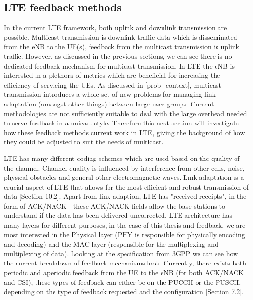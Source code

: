 \documentclass{article}
\begin{document}
\subsection{LTE feedback methods}\label{lte_feedback_current}




In the current LTE framework, both uplink and downlink transmission are possible. Multicast transmission is downlink traffic data which is disseminated from the eNB to the UE(s), feedback from the multicast transmission is uplink traffic. However, as discussed in the previous sections, we can see there is no dedicated feedback mechanism for multicast transmission. In LTE the eNB is interested in a plethora of metrics which are beneficial for increasing the efficiency of servicing the UEs. As discussed in \cref{prob_context}, multicast transmission introduces a whole set of new problems for managing link adaptation (amongst other things) between large user groups. Current methodologies are not sufficiently suitable to deal with the large overhead needed to serve feedback in a unicast style. Therefore this next section will investigate how these feedback methods current work in LTE, giving the background of how they could be adjusted to suit the needs of multicast.

LTE has many different coding schemes which are used based on the quality of the channel. Channel quality is influenced by interference from other cells, noise,  physical obstacles and general other electromagnetic waves.  Link adaptation is a crucial aspect of LTE that allows for the most efficient and robust transmission of data \cite{umts_sesia}[Section 10.2]. Apart from link adaption, LTE has "received receipts", in the form of ACK/NACK - these ACK/NACK fields allow the base stations to understand if the data has been delivered uncorrected. LTE architecture has many layers for different purposes, in the case of this thesis and feedback, we are most interested in the Physical layer (PHY is responsible for physically encoding and decoding) and the MAC layer (responsible for the multiplexing and multiplexing of data). Looking at the specification from 3GPP we can see how the current breakdown of feedback mechanisms look. Currently, there exists both periodic and aperiodic feedback from the UE to the eNB (for both ACK/NACK and CSI), these types of feedback can either be on the PUCCH or the PUSCH, depending on the type of feedback requested and the configuration \cite{ETSITS136213}[Section 7.2]. 
\end{document}
